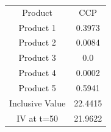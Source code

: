 \begin{tabular}{cc}
Product & CCP \\
Product 1 & 0.3973 \\
Product 2 & 0.0084 \\
Product 3 & 0.0 \\
Product 4 & 0.0002 \\
Product 5 & 0.5941 \\
Inclusive Value & 22.4415 \\
IV at t=50 & 21.9622 \\
\end{tabular}